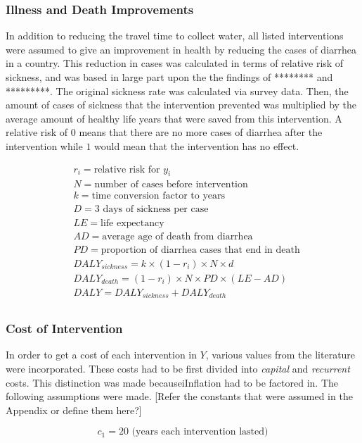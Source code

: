 \subsubsection*{Illness and Death Improvements}
In addition to reducing the travel time to collect water, all listed interventions were assumed to give an improvement in health by reducing the cases of diarrhea in a country. 
This reduction in cases was calculated in terms of relative risk of sickness, and was based in large part upon the the findings of ******** and *********.
The original sickness rate was calculated via survey data.
Then, the amount of cases of sickness that the intervention prevented was multiplied by the average amount of healthy life years that were saved from this intervention. A relative risk of $0$ means that there are no more cases of diarrhea after the intervention while $1$ would mean that the intervention has no effect.

\begin{equation*}
\begin{aligned}
& r_i = \text{relative risk for } y_i \\
& N = \text{number of cases before intervention} \\
& k = \text{time conversion factor to years} \\
& D = \text{3 days of sickness per case} \\
& LE  = \text{life expectancy} \\
& AD = \text{average age of death from diarrhea} \\
& PD = \text{proportion of diarrhea cases that end in death} \\
& DALY_{sickness} = k \times (1-r_i) \times N \times d \\
& DALY_{death} = (1-r_i)\times N \times PD \times (LE - AD) \\
& DALY = DALY_{sickness} + DALY_{death} \\
\end{aligned}
\end{equation*}

\subsubsection*{Cost of Intervention}
In order to get a cost of each intervention in $Y$, various values from the literature were incorporated.
These costs had to be first divided into \emph{capital} and \emph{recurrent} costs.
This distinction was made becauseiInflation had to be factored in.
The following assumptions were made.
[Refer the constants that were assumed in the Appendix or define them here?]

$$c_1 = 20 \text{ (years each intervention lasted)}$$
